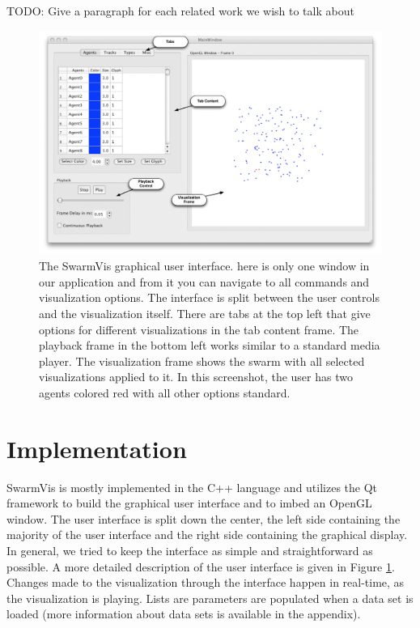 \documentclass[conference]{IEEEtran}
\begin{document}
TODO: Give a paragraph for each related work we wish to talk about

\begin{figure}[ht]
\centering
\includegraphics[scale=.45]{images/swarmvis-annotated.pdf}
\caption{The SwarmVis graphical user interface. 
here is only one window in our application and from it you can navigate to all commands and visualization options.
The interface is split between the user controls and the visualization itself. There are tabs at the top left that give
options for different visualizations in the tab content frame. The playback frame in the bottom left works similar to a
standard media player. The visualization frame shows the swarm with all selected visualizations applied to it. In this
screenshot, the user has two agents colored red with all other options standard. }
\label{AnnotatedWindow}
\end{figure}

\section{Implementation}
SwarmVis is mostly  implemented in the C++ language and utilizes the Qt framework\cite{Qt:website}
to build the graphical user interface and to imbed an OpenGL window.
The user interface is split down the center,
the left side containing the majority of the user interface and the right side containing the graphical display.
In general, we tried to keep the interface as simple and straightforward as possible.
A more detailed description of the user interface is given in Figure \ref{AnnotatedWindow}.
Changes made to the visualization through the interface happen in real-time, as the visualization is playing.
Lists are parameters are populated when a data set is loaded (more information about data sets is available in the appendix).
\end{document}
